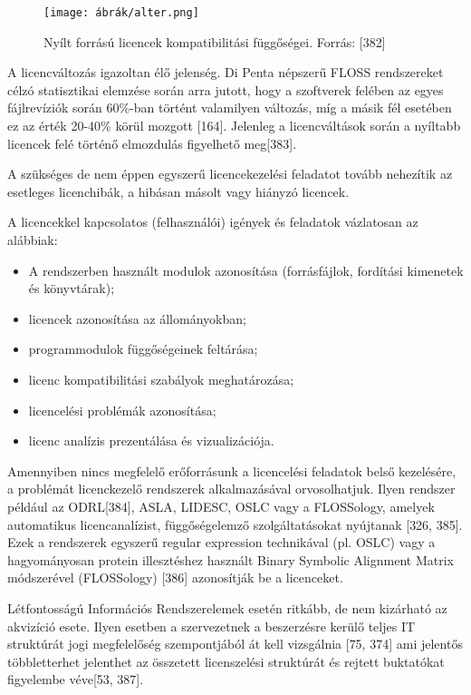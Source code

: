 \documentclass[12pt,magyar,a4paper,oneside]{scrreprt}
\providecommand{\tightlist}{%
  \setlength{\itemsep}{0pt}\setlength{\parskip}{0pt}}
\begin{document}
\begin{figure}
\hypertarget{fig:figLicencDeps}{%
\centering
\texttt{[image: ábrák/alter.png]}
\caption{Nyílt forrású licencek kompatibilitási függőségei. Forrás:
{[}382{]}}\label{fig:figLicencDeps}
}
\end{figure}

A licencváltozás igazoltan élő jelenség. Di Penta népszerű FLOSS
rendszereket célzó statisztikai elemzése során arra jutott, hogy a
szoftverek felében az egyes fájlrevíziók során 60\%-ban történt
valamilyen változás, míg a másik fél esetében ez az érték 20-40\% körül
mozgott {[}164{]}. Jelenleg a licencváltások során a nyíltabb licencek
felé történő elmozdulás figyelhető meg{[}383{]}.

A szükséges de nem éppen egyszerű licencekezelési feladatot tovább
nehezítik az esetleges licenchibák, a hibásan másolt vagy hiányzó
licencek.

A licencekkel kapcsolatos (felhasználói) igények és feladatok vázlatosan
az alábbiak:

\begin{itemize}
\tightlist
\item
  A rendszerben használt modulok azonosítása (forrásfájlok, fordítási
  kimenetek és könyvtárak);
\item
  licencek azonosítása az állományokban;
\item
  programmodulok függőségeinek feltárása;
\item
  licenc kompatibilitási szabályok meghatározása;
\item
  licencelési problémák azonosítása;
\item
  licenc analízis prezentálása és vizualizációja.
\end{itemize}

Amennyiben nincs megfelelő erőforrásunk a licencelési feladatok belső
kezelésére, a problémát licenckezelő rendszerek alkalmazásával
orvosolhatjuk. Ilyen rendszer például az ODRL{[}384{]}, ASLA, LIDESC,
OSLC vagy a FLOSSology, amelyek automatikus licencanalízist,
függőségelemző szolgáltatásokat nyújtanak {[}326, 385{]}. Ezek a
rendszerek egyszerű regular expression technikával (pl. OSLC) vagy a
hagyományosan protein illesztéshez használt Binary Symbolic Alignment
Matrix módszerével (FLOSSology) {[}386{]} azonosítják be a licenceket.

Létfontosságú Információs Rendszerelemek esetén ritkább, de nem
kizárható az akvizíció esete. Ilyen esetben a szervezetnek a beszerzésre
kerülő teljes IT struktúrát jogi megfelelőség szempontjából át kell
vizsgálnia {[}75, 374{]} ami jelentős többletterhet jelenthet az
összetett licenszelési struktúrát és rejtett buktatókat figyelembe
véve{[}53, 387{]}.
\end{document}
